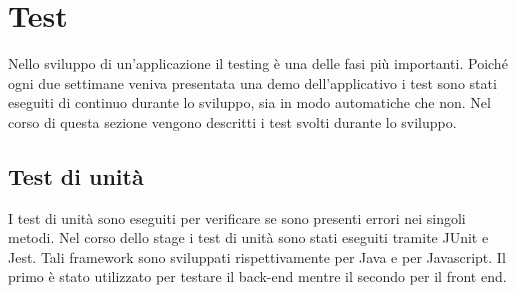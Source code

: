\section{Test}
Nello sviluppo di un'applicazione il testing è una delle fasi più importanti. Poiché ogni due settimane veniva presentata una demo dell'applicativo i test sono stati eseguiti di continuo durante lo sviluppo, sia in modo automatiche che non. Nel corso di questa sezione vengono descritti i test svolti durante lo sviluppo.

\subsection{Test di unità}
I test di unità sono eseguiti per verificare se sono presenti errori nei singoli metodi. Nel corso dello stage i test di unità sono stati eseguiti tramite JUnit e Jest. Tali framework sono sviluppati rispettivamente per Java e per Javascript. Il primo è stato utilizzato per testare il back-end mentre il secondo per il front end.

